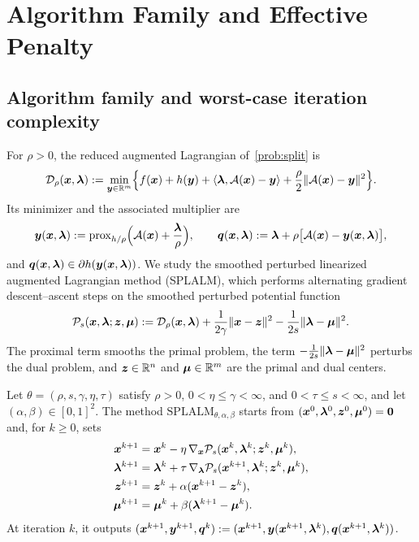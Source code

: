 \section{Algorithm Family and Effective Penalty}
\label{sec:algorithm-framework}

\subsection{Algorithm family and worst-case iteration complexity}
\label{subsec:algorithm-family}

For \(\rho>0\), the reduced augmented Lagrangian of~\eqref{prob:split} is
\begin{equation}
    \mathcal{D}_\rho(\bm{x},\bm{\lambda})
    :=\min_{\bm{y}\in\mathbb{R}^m}\Bigl\{f(\bm{x})+h(\bm{y})+\langle\bm{\lambda},\mathcal{A}(\bm{x})-\bm{y}\rangle
    +\frac{\rho}{2}\|\mathcal{A}(\bm{x})-\bm{y}\|^2\Bigr\}.
    \label{eq:reduced-al}
\end{equation}
Its minimizer and the associated multiplier are
\begin{equation}
    \bm{y}(\bm{x},\bm{\lambda}):=\mathrm{prox}_{h/\rho}\Bigl(\mathcal{A}(\bm{x})+\frac{\bm{\lambda}}{\rho}\Bigr),
    \qquad
    \bm{q}(\bm{x},\bm{\lambda}):=\bm{\lambda}+\rho\bigl[\mathcal{A}(\bm{x})-\bm{y}(\bm{x},\bm{\lambda})\bigr],
    \label{eq:prox-multiplier}
\end{equation}
and \(\bm{q}(\bm{x},\bm{\lambda})\in\partial h(\bm{y}(\bm{x},\bm{\lambda}))\).
We study the smoothed perturbed linearized augmented Lagrangian method
(SPLALM), which performs alternating gradient descent--ascent steps on the
smoothed perturbed potential function
\begin{equation}
    \mathcal P_s(\bm{x},\bm{\lambda};\bm{z},\bm{\mu})
    :=\mathcal{D}_\rho(\bm{x},\bm{\lambda})+\frac{1}{2\gamma}\|\bm{x}-\bm{z}\|^2
    -\frac{1}{2s}\|\bm{\lambda}-\bm{\mu}\|^2 .
    \label{eq:potential}
\end{equation}
The proximal term smooths the primal problem, the term
\(-\frac{1}{2s}\|\bm{\lambda}-\bm{\mu}\|^2\) perturbs the dual problem, and
\(\bm{z}\in\mathbb{R}^n\) and \(\bm{\mu}\in\mathbb{R}^m\) are the primal and dual centers.

\begin{definition}[SPLALM]
\label{def:splalm}
Let \(\theta=(\rho,s,\gamma,\eta,\tau)\) satisfy \(\rho>0\),
\(0<\eta\le\gamma<\infty\), and \(0<\tau\le s<\infty\), and let
\((\alpha,\beta)\in[0,1]^2\). The method \(\mathrm{SPLALM}_{\theta,\alpha,\beta}\)
starts from \((\bm{x}^0,\bm{\lambda}^0,\bm{z}^0,\bm{\mu}^0)=\bm{0}\) and, for \(k\ge0\), sets
\begin{equation}
\begin{aligned}
    \bm{x}^{k+1}&=\bm{x}^k-\eta\,\nabla_{\bm{x}}\mathcal P_s(\bm{x}^k,\bm{\lambda}^k;\bm{z}^k,\bm{\mu}^k),\\
    \bm{\lambda}^{k+1}&=\bm{\lambda}^k+\tau\,\nabla_{\bm{\lambda}}\mathcal P_s(\bm{x}^{k+1},\bm{\lambda}^k;\bm{z}^k,\bm{\mu}^k),\\
    \bm{z}^{k+1}&=\bm{z}^k+\alpha(\bm{x}^{k+1}-\bm{z}^k),\\
    \bm{\mu}^{k+1}&=\bm{\mu}^k+\beta(\bm{\lambda}^{k+1}-\bm{\mu}^k).
\end{aligned}
    \label{eq:splalm-updates}
\end{equation}
At iteration \(k\), it outputs
\((\bm{x}^{k+1},\bm{y}^{k+1},\bm{q}^k)
:=(\bm{x}^{k+1},\bm{y}(\bm{x}^{k+1},\bm{\lambda}^k),\bm{q}(\bm{x}^{k+1},\bm{\lambda}^k))\).
\end{definition}


